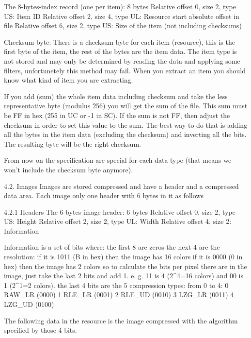  The 8-bytes-index record (one per item): 8 bytes
  Relative offset 0, size 2, type US: Item ID
  Relative offset 2, size 4, type UL: Resource start absolute offset in
                                      file
  Relative offset 6, size 2, type US: Size of the item (not including
                                      checksums)

 Checksum byte:
 There is a checksum byte for each item (resource), this is the first byte
 of the item, the rest of the bytes are the item data. The item type is not
 stored and may only be determined by reading the data and applying some
 filters, unfortunetely this method may fail. When you extract an item you
 should know what kind of item you are extracting.

 If you add (sum) the whole item data including checksum and take the less
 representative byte (modulus 256) you will get the sum of the file. This sum
 must be FF in hex (255 in UC or -1 in SC). If the sum is not FF, then adjust
 the checksum in order to set this value to the sum. The best way to do that is
 adding all the bytes in the item data (excluding the checksum) and inverting
 all the bits. The resulting byte will be the right checksum.

 From now on the specification are special for each data type (that means we
 won't include the checksum byte anymore).

4.2. Images
 Images are stored compressed and have a header and a compressed data area.
 Each image only one header with 6 bytes in it as follows

4.2.1 Headers
 The 6-bytes-image header: 6 bytes
  Relative offset 0, size 2, type US: Height
  Relative offset 2, size 2, type UL: Width
  Relative offset 4, size 2: Information

 Information is a set of bits where:
  the first 8 are zeros
  the next 4 are the resolution:
   if it is 1011 (B in hex) then the image has 16 colors
   if it is 0000 (0 in hex) then the image has 2 colors
   so to calculate the bits per pixel there are in the image, just take the
   last 2 bits and add 1. e. g. 11 is 4 (2^4=16 colors) and
	 00 is 1 (2^1=2 colors).
  the last 4 bits are the 5 compression types:
   from 0 to 4:
   0 RAW_LR (0000)
   1 RLE_LR (0001)
   2 RLE_UD (0010)
   3 LZG_LR (0011)
   4 LZG_UD (0100)

 The following data in the resource is the image compressed with the algorithm
 specified by those 4 bits.

